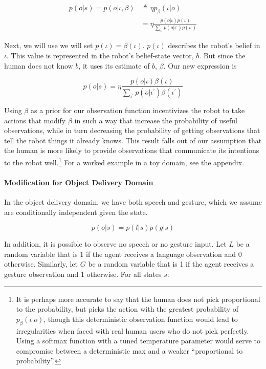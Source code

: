 \documentclass{article}
\begin{document}
\begin{multicols}{2}
\begin{align}
p(o|s) = p(o|\iota, \beta) &\triangleq \eta p_\beta(\iota|o) \\
&= \eta \frac{p(o|\iota) p(\iota)}{\sum_{\iota^\prime} p(o|\iota^\prime)p(\iota^\prime)} 
\end{align}

Next, we will use we will set $p(\iota) = \beta(\iota)$. $p(\iota)$ describes the robot's belief in $\iota$. This value is represented in the robot's belief-state vector, $b$. But since the human does not know $b$, it uses its estimate of $b$, $\beta$. Our new expression is 


$$p(o|s) = \eta \frac{p(o|\iota) \beta(\iota)}{\sum_{\iota^\prime} p(o|\iota^\prime)\beta(\iota^\prime)} $$

Using $\beta$ as a prior for our observation function incentivizes the robot to take actions that modify $\beta$ in such a way that increase the probability of useful observations, while in turn decreasing the probability of getting observations that tell the robot things it already knows. This result falls out of our assumption that the human is more likely to provide observations that communicate its intentions to the robot well.\footnote{It is perhaps more accurate to say that the human does not pick proportional to the probability, but picks the action with the greatest probability of $p_{\beta}(\iota|o)$, though this deterministic observation function would lead to irregularities when faced with real human users who do not pick perfectly. Using a softmax function with a tuned temperature parameter would serve to compromise between a deterministic max and a weaker ``proportional to probability''.}  For a worked example in a toy domain, see the appendix. 



\paragraph{Modification for Object Delivery Domain}


In the object delivery domain, we have both speech and gesture, which we assume are conditionally independent given the state. 

$$p(o|s) = p(l|s)p(g|s)$$

In addition, it is possible to observe no speech or no gesture input. Let $L$ be a random variable that is 1 if the agent receives a language observation and 0 otherwise. Similarly, let $G$ be a random variable that is 1 if the agent receives a gesture observation and 1 otherwise. For all states $s$: 


\end{multicols}
\end{document}
